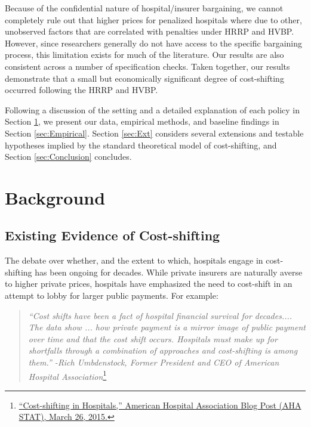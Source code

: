 \documentclass[12pt]{article}
\begin{document}
Because of the confidential nature of hospital/insurer bargaining, we cannot completely rule out that higher prices for penalized hospitals where due to other, unobserved factors that are correlated with penalties under HRRP and HVBP.  However, since researchers generally do not have access to the specific bargaining process, this limitation exists for much of the literature. Our results are also consistent across a number of specification checks. Taken together, our results demonstrate that a small but economically significant degree of cost-shifting occurred following the HRRP and HVBP.

Following a discussion of the setting and a detailed explanation of each policy in Section \ref{sec:Background}, we present our data, empirical methods, and baseline findings in Section \ref{sec:Empirical}. Section \ref{sec:Ext} considers several extensions and testable hypotheses implied by the standard theoretical model of cost-shifting, and Section \ref{sec:Conclusion} concludes.

\section{Background}
\label{sec:Background}

\subsection{Existing Evidence of Cost-shifting}
The debate over whether, and the extent to which, hospitals engage in cost-shifting has been ongoing for decades. While private insurers are naturally averse to higher private prices, hospitals have emphasized the need to cost-shift in an attempt to lobby for larger public payments. For example:
\begin{quote}
\textit{``Cost shifts have been a fact of hospital financial survival for decades.... The data show ...  how private payment is a mirror image of public payment over time and that the cost shift occurs. Hospitals must make up for shortfalls through a combination of approaches and cost-shifting is among them.'' -Rich Umbdenstock, Former President and CEO of American Hospital Association}\footnote{\href{http://blog.aha.org/post/costshifting-in-hospitals-}{``Cost-shifting in Hospitals,'' American Hospital Association Blog Post (AHA STAT), March 26, 2015.}}
\end{quote}
\end{document}

